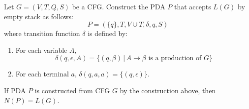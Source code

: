 \documentclass[]{article}
\begin{document}
    \indent Let $G = (V,T,Q,S)$ be a CFG. Construct the PDA $P$ that accepts
    $L(G)$ by empty stack as follows:
      \[ P = (\{q\},T,V\cup T,\delta,q,S) \]
    where transition function $\delta$ is defined by:
      \begin{enumerate}
        \item For each variable $A$,
          \[
            \delta(q,\epsilon,A) = \{(q,\beta) \, | \, A \rightarrow \beta \, \,
            \text{is a production of} \, \, G \}
          \]
        \item For each terminal $a$, $\delta(q,a,a) = \{(q,\epsilon)\}$.
      \end{enumerate}
      \begin{thm}
        If PDA $P$ is constructed from CFG $G$ by the construction above, then
        $N(P) = L(G)$.
      \end{thm}
\end{document}
